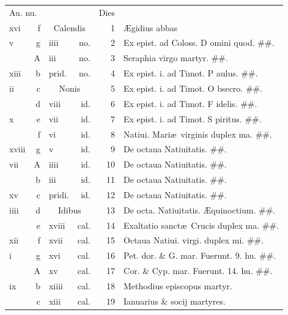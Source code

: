 \documentclass[a5paper,10pt]{book}
\def\ae{æ}
\def\AE{Æ}
\begin{document}
\begin{center}
\begin{tabular}{l r l r r l}
\multicolumn{2}{l}{\color{red}Au. nu.} & & & \color{red} Dies & \\
xvi & f & \multicolumn{2}{c}{\color{red} Calendis} & 1 & \AE gidius abbas \\
v & g & iiii & no. & 2 & Ex epist. ad Coloss. \color{red} D\color{black} omini quod. \#\#.\\
 & \color{red} A & iii & no. & 3 & Seraphia virgo martyr. \#\#.\\
xiii & b & \color{red} prid. & no. & 4 & Ex epist. i. ad Timot. \color{red} P\color{black} aulus. \#\#.\\
ii & c & \multicolumn{2}{c}{\color{red} Nonis} & 5 & Ex epist. i. ad Timot. \color{red} O\color{black} bsecro. \#\#.\\
 & d & viii & id. & 6 & Ex epist. i. ad Timot. \color{red} F\color{black} idelis. \#\#.\\
x & e & vii & id. & 7 & Ex epist. i. ad Timot. \color{red} S\color{black} piritus. \#\#.\\
 & f & vi & id. & 8 & \color{red} Natiui. Mari\ae \ virginis duplex ma. \color{black} \#\#.\\
xviii & g & v & id. & 9 & De octaua Natiuitatis. \#\#. \\
vii & \color{red} A & iiii & id. & 10 & De octaua Natiuitatis. \#\#.\\
 & b & iii & id. & 11 & De octaua Natiuitatis. \#\#.\\
xv & c & \color{red} pridi. & id. & 12 & De octaua Natiuitatis. \#\#.\\
iiii & d & \multicolumn{2}{c}{\color{red} Idibus} & 13 & De octa. Natiuitatis. \color{red} \AE quinoctium. \color{black} \#\#.\\
 & e & xviii & cal. & 14 & \color{red} Exaltatio sanct\ae \ Crucis duplex ma. \color{black} \#\#.\\%
xii & f & xvii & cal. & 15 & \color{red} Octaua Natiui. virgi. duplex mi. \color{black} \#\#.\\
i & g & xvi & cal. & 16 & Pet. dor. \& G. mar. \color{red} Fuerunt. 9. hu.\color{black} \#\#.\\
 & \color{red} A & xv & cal. & 17 & Cor. \& Cyp. mar. \color{red} Fuerunt. 14. hu. \color{black} \#\#.\\
ix & b & xiiii & cal. & 18 & Methodius episcopus martyr. \\
 & c & xiii & cal. & 19 & Ianuarius \& socij martyres. \\

\end{tabular}
\end{center}
\end{document}
